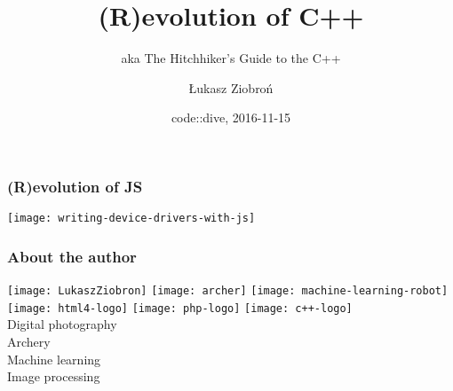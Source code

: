 \author{Łukasz Ziobroń}
\title[Crisis]{(R)evolution of C++}
\date{code::dive, 2016-11-15}
\subject{Computer Science}
\subtitle{aka The Hitchhiker's Guide to the C++}

\begin{frame}
\titlepage
\end{frame}

\begin{frame}
  \frametitle{(R)evolution of JS}
  \centering 
  \texttt{[image: writing-device-drivers-with-js]}
\end{frame}

\begin{frame}
  \frametitle{About the author}
  \texttt{[image: LukaszZiobron]}
  \texttt{[image: archer]}
  \texttt{[image: machine-learning-robot]} \\
  \texttt{[image: html4-logo]}
  \texttt{[image: php-logo]}
  \texttt{[image: c++-logo]} \\
  Digital photography \\
  Archery \\
  Machine learning \\
  Image processing \\
\end{frame}











